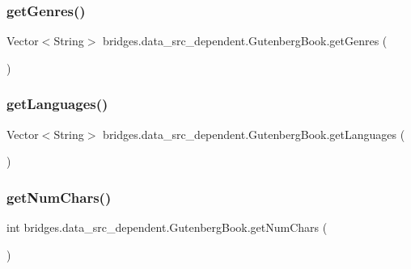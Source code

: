 \subsubsection{\texorpdfstring{get\+Genres()}{getGenres()}}
{\footnotesize\ttfamily Vector$<$String$>$ bridges.\+data\+\_\+src\+\_\+dependent.\+Gutenberg\+Book.\+get\+Genres (\begin{DoxyParamCaption}{ }\end{DoxyParamCaption})}

\hypertarget{classbridges_1_1data__src__dependent_1_1_gutenberg_book_a75fffcba3f25be92c02fda1d42c9bcc4}{}\label{classbridges_1_1data__src__dependent_1_1_gutenberg_book_a75fffcba3f25be92c02fda1d42c9bcc4} 
\subsubsection{\texorpdfstring{get\+Languages()}{getLanguages()}}
{\footnotesize\ttfamily Vector$<$String$>$ bridges.\+data\+\_\+src\+\_\+dependent.\+Gutenberg\+Book.\+get\+Languages (\begin{DoxyParamCaption}{ }\end{DoxyParamCaption})}

\hypertarget{classbridges_1_1data__src__dependent_1_1_gutenberg_book_a232d5410eaef5ef75208d42a5125a363}{}\label{classbridges_1_1data__src__dependent_1_1_gutenberg_book_a232d5410eaef5ef75208d42a5125a363} 
\subsubsection{\texorpdfstring{get\+Num\+Chars()}{getNumChars()}}
{\footnotesize\ttfamily int bridges.\+data\+\_\+src\+\_\+dependent.\+Gutenberg\+Book.\+get\+Num\+Chars (\begin{DoxyParamCaption}{ }\end{DoxyParamCaption})}

\hypertarget{classbridges_1_1data__src__dependent_1_1_gutenberg_book_ad73c847c8f4c2ce0873b2f14ae6af704}{}\label{classbridges_1_1data__src__dependent_1_1_gutenberg_book_ad73c847c8f4c2ce0873b2f14ae6af704} 
